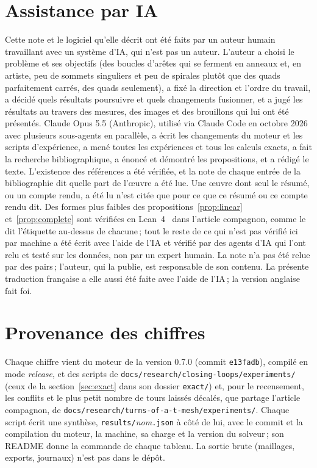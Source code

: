 \documentclass[11pt,a4paper]{article}
\begin{document}
\section*{Assistance par IA}
Cette note et le logiciel qu'elle décrit ont été faits par un auteur humain
travaillant avec un système d'IA, qui n'est pas un auteur. L'auteur a choisi
le problème et ses objectifs (des boucles d'arêtes qui se ferment en anneaux
et, en artiste, peu de sommets singuliers et peu de spirales plutôt que des
quads parfaitement carrés, des quads seulement), a fixé la direction et
l'ordre du travail, a décidé quels résultats poursuivre et quels changements
fusionner, et a jugé les résultats au travers des mesures, des images et des
brouillons qui lui ont été présentés. Claude Opus 5.5 (Anthropic), utilisé
via Claude Code en octobre 2026 avec plusieurs sous-agents en parallèle, a
écrit les changements du moteur et les scripts d'expérience, a mené toutes
les expériences et tous les calculs exacts, a fait la recherche
bibliographique, a énoncé et démontré les propositions, et a rédigé le
texte. L'existence des références a été vérifiée, et la note de chaque
entrée de la bibliographie dit quelle part de l'œuvre a été lue. Une œuvre dont seul le résumé, ou un compte rendu, a été lu n'est citée que pour ce que ce résumé ou ce compte rendu dit. Des formes
plus faibles des propositions~\ref{prop:linear} et~\ref{prop:complete} sont
vérifiées en Lean~4~\cite{demoura2021lean4} dans l'article compagnon, comme
le dit l'étiquette au-dessus de chacune\,; tout
le reste de ce qui n'est pas vérifié ici par machine a été écrit avec l'aide
de l'IA et vérifié par des agents d'IA qui l'ont relu et testé sur les
données, non par un expert humain. La note n'a pas été relue par des
pairs\,; l'auteur, qui la publie, est responsable de son contenu. La présente
traduction française a elle aussi été faite avec l'aide de l'IA\,; la
version anglaise fait foi.




\appendix

\section{Provenance des chiffres}\label{app:provenance}

Chaque chiffre vient du moteur de la version 0.7.0 (commit
\texttt{e13fadb}), compilé en mode \emph{release}, et des scripts de
\nolinkurl{docs/research/closing-loops/experiments/} (ceux de la
section~\ref{sec:exact} dans son dossier \nolinkurl{exact/}) et, pour le
recensement, les conflits et le plus petit nombre de tours laissés décalés,
que partage l'article compagnon, de
\nolinkurl{docs/research/turns-of-a-t-mesh/experiments/}. Chaque script
écrit une synthèse, \texttt{results/}\textit{nom}\texttt{.json} à côté de
lui, avec le commit et la compilation du moteur, la machine, sa charge et la
version du solveur\,; son README donne la commande de chaque tableau. La
sortie brute (maillages, exports, journaux) n'est pas dans le dépôt.
\end{document}
